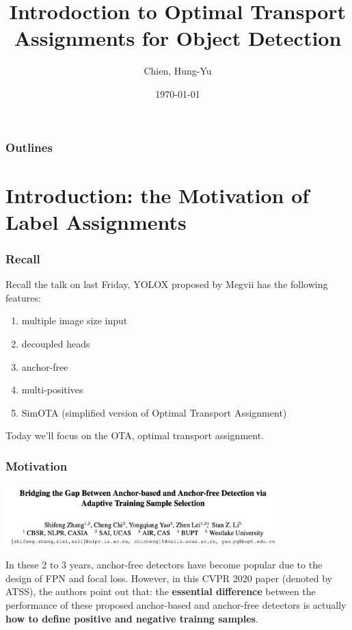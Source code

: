\documentclass[slidetop, mathserif, dvipsnames]{beamer}
\title[OTA]{Introdoction to Optimal Transport Assignments for Object Detection}
\author[chy1010]{Chien, Hung-Yu}
\date{\today}
\begin{document}
\begin{frame}
	\titlepage
\end{frame}

\section[Outline]{}
\begin{frame}
	\frametitle{Outlines}
	\tableofcontents
\end{frame}

\section{Introduction: the Motivation of Label Assignments}

\begin{frame}
    \frametitle{Recall}
    Recall the talk on last Friday, YOLOX proposed by Megvii has the following features:
    \begin{enumerate}
        \item multiple image size input
        \item decoupled heads
        \item anchor-free
        \item multi-positives
        \item SimOTA (simplified version of Optimal Transport Assignment)
    \end{enumerate}

    \quad

    Today we'll focus on the OTA, optimal transport assignment.

\end{frame}

\begin{frame}
    \frametitle{Motivation}

    \includegraphics[width=300pt]{pics/atss_paper.png}

    \quad

    In these 2 to 3 years, anchor-free detectors have become popular
    due to the design of FPN and focal loss.
    However, in this CVPR 2020 paper (denoted by ATSS), the authors point out that:
    the {\bf essential difference} between the performance of these proposed
    anchor-based and anchor-free detectors is actually
    {\bf how to define positive and negative trainng samples}.

\end{frame}
\end{document}
